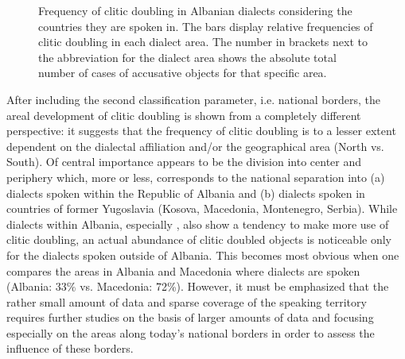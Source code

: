 \documentclass[output=paper]{langsci/langscibook}
\begin{document}
\begin{figure}
\footnotesize
\caption{Frequency of clitic doubling in Albanian dialects considering the countries they are spoken in. The bars display relative frequencies of clitic doubling in each dialect area. The number in brackets next to the abbreviation for the dialect area shows the absolute total number of cases of accusative objects for that specific area. \label{fig8}}
\end{figure}

After including the second classification parameter, i.e. national borders, the areal development of clitic doubling is shown from a completely different perspective: it suggests that the frequency of clitic doubling is to a lesser extent dependent on the dialectal affiliation and/or the geographical area (North vs. South). Of central importance appears to be the division into center and periphery which, more or less, corresponds to the national separation into (a) dialects spoken within the Republic of Albania and (b) dialects spoken in countries of former Yugoslavia (Kosova, Macedonia, Montenegro, Serbia). While  dialects within Albania, especially , also show a tendency to make more use of clitic doubling, an actual abundance of clitic doubled objects is noticeable only for the dialects spoken outside of Albania. This becomes most obvious when one compares the areas in Albania and Macedonia where  dialects are spoken (Albania: 33\% vs. Macedonia: 72\%). However, it must be emphasized that the rather small amount of data and sparse coverage of the speaking territory requires further studies on the basis of larger amounts of data and focusing especially on the areas along today’s national borders in order to assess the influence of these borders.
\end{document}
